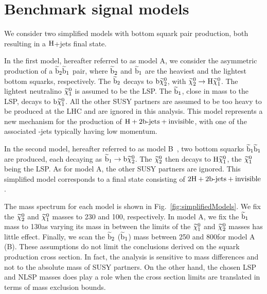 \section{Benchmark signal models}
\label{sec:models}

We consider two simplified models with bottom squark pair production, both
resulting in a $\mathrm{H}$+jets final state.

In the first model, hereafter referred to as model A, we consider the
asymmetric production of a $\widetilde{\mathrm{b}}_2
\widetilde{\mathrm{b}}_1$ pair, where $\widetilde{\mathrm{b}}_2$ and $\widetilde{\mathrm{b}}_1$ are the heaviest
and the lightest bottom squarks, respectively. The $\widetilde{\mathrm{b}}_2$ decays
to $\mathrm{b} \widetilde{\chi}^{0}_2$, with $\widetilde{\chi}^{0}_2 \to \mathrm{H} \widetilde{\chi}^{0}_1$. The lightest neutralino $\widetilde{\chi}^{0}_1$ is
assumed to be the LSP. The $\widetilde{\mathrm{b}}_1$, close in mass to the LSP,
decays to $\mathrm{b} \widetilde{\chi}^{0}_1$. All the other SUSY partners are assumed to be
too heavy to be produced at the LHC and are ignored in this
analysis. This model represents a new mechanism for the production of
$\mathrm{H}+2\mathrm{b}\textrm{-}\mathrm{jets}+\mathrm{invisible}$, with one of
the associated \cPqb-jets typically having low momentum.

In the second model, hereafter referred to as model B~\cite{annthesis}, two bottom
squarks $\widetilde{\mathrm{b}}_1\widetilde{\mathrm{b}}_1$ are produced, each decaying as
$\widetilde{\mathrm{b}}_1 \to \mathrm{b} \widetilde{\chi}^{0}_2$. The $\widetilde{\chi}^{0}_2$ then decays to $\mathrm{H}
\widetilde{\chi}^{0}_1$, the $\widetilde{\chi}^{0}_1$ being the LSP. As for model A, the other SUSY
partners are ignored. This simplified model corresponds to a final
state consisting of $2\mathrm{H}+2\mathrm{b}\textrm{-}\mathrm{jets}+\mathrm{invisible}$.

The mass spectrum for each model is shown in
Fig.~\ref{fig:simplifiedModels}. We fix the $\widetilde{\chi}^{0}_2$ and $\widetilde{\chi}^{0}_1$ masses to 230\GeV
and 100\GeV, respectively.  In model A, %
we fix the $\widetilde{\mathrm{b}}_1$ mass to 130\GeV as varying its mass
in between the limits of the $\widetilde{\chi}^{0}_1$ and $\widetilde{\chi}^{0}_2$ masses has little effect.
Finally, we scan the $\widetilde{\mathrm{b}}_2$ ($\widetilde{\mathrm{b}}_1$) mass between 250\GeV
and 800\GeV for model A (B). These assumptions do not limit the
conclusions derived on the squark production cross section. In fact,
the analysis is sensitive to mass differences and not to the absolute
mass of SUSY partners. On the other hand, the chosen LSP and NLSP
masses does play a role when the cross section limits are
translated in terms of mass exclusion bounds.


